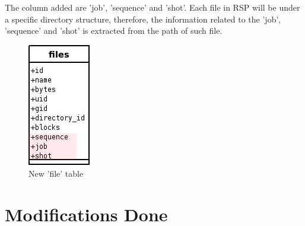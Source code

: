 \documentclass[a4paper,10pt]{article}
\begin{document}
The column added are 'job', 'sequence' and 'shot'.  Each file in RSP will be under a specific directory structure, therefore, the information related to the 'job', 'sequence' and 'shot' is extracted from the path of such file.

\begin{figure}[h]
 \centering
 \includegraphics[scale=0.5]{images/fileTableModified.jpg}
 \caption{New 'file' table}
 \label{fig:filetable}
\end{figure}

\section{Modifications Done}
\end{document}
